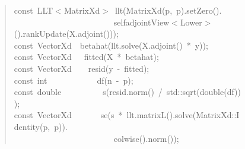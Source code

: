 \documentclass[shortnames,article]{jss}
\newcommand{\hlstd}[1]{\textcolor[rgb]{0,0,0}{#1}}
\newcommand{\hlopt}[1]{\textcolor[rgb]{0,0,0}{#1}}
\newcommand{\hlkwb}[1]{\textcolor[rgb]{0.13,0.54,0.13}{#1}}
\newcommand{\hlkwd}[1]{\textcolor[rgb]{0,0,0}{#1}}
\begin{document}
\begin{figure}[tbh]
\begin{quote}
    \hlstd{}\hlkwb{const\ }\hlstd{LLT}\hlopt{$<$}\hlstd{MatrixXd}\hlopt{$>$\ }\hlstd{}\hlkwd{llt}\hlstd{}\hlopt{(}\hlstd{}\hlkwd{MatrixXd}\hlstd{}\hlopt{(}\hlstd{p}\hlopt{,\ }\hlstd{p}\hlopt{).}\hlstd{}\hlkwd{setZero}\hlstd{}\hlopt{().}\hspace*{\fill}\\
    \hlstd{}\hlstd{\ \ \ \ \ \ \ \ \ \ \ \ \ \ \ \ \ \ \ \ \ \ \ \ }\hlstd{selfadjointView}\hlopt{$<$}\hlstd{Lower}\hlopt{$>$().}\hlstd{}\hlkwd{rankUpdate}\hlstd{}\hlopt{(}\hlstd{X}\hlopt{.}\hlstd{}\hlkwd{adjoint}\hlstd{}\hlopt{()));}\hspace*{\fill}\\
    \hlstd{}\hlkwb{const\ }\hlstd{VectorXd}\hlstd{\ \ }\hlstd{}\hlkwd{betahat}\hlstd{}\hlopt{(}\hlstd{llt}\hlopt{.}\hlstd{}\hlkwd{solve}\hlstd{}\hlopt{(}\hlstd{X}\hlopt{.}\hlstd{}\hlkwd{adjoint}\hlstd{}\hlopt{()\ {*}\ }\hlstd{y}\hlopt{));}\hspace*{\fill}\\
    \hlstd{}\hlkwb{const\ }\hlstd{VectorXd}\hlstd{\ \ \ }\hlstd{}\hlkwd{fitted}\hlstd{}\hlopt{(}\hlstd{X\ }\hlopt{{*}\ }\hlstd{betahat}\hlopt{);}\hspace*{\fill}\\
    \hlstd{}\hlkwb{const\ }\hlstd{VectorXd}\hlstd{\ \ \ \ }\hlstd{}\hlkwd{resid}\hlstd{}\hlopt{(}\hlstd{y\ }\hlopt{{-}\ }\hlstd{fitted}\hlopt{);}\hspace*{\fill}\\
    \hlstd{}\hlkwb{const\ int}\hlstd{\ \ \ \ \ \ \ \ \ \ \ \ }\hlkwb{}\hlstd{}\hlkwd{df}\hlstd{}\hlopt{(}\hlstd{n\ }\hlopt{{-}\ }\hlstd{p}\hlopt{);}\hspace*{\fill}\\
    \hlstd{}\hlkwb{const\ double}\hlstd{\ \ \ \ \ \ \ \ \ \ }\hlkwb{}\hlstd{}\hlkwd{s}\hlstd{}\hlopt{(}\hlstd{resid}\hlopt{.}\hlstd{}\hlkwd{norm}\hlstd{}\hlopt{()\ /\ }\hlstd{std}\hlopt{::}\hlstd{}\hlkwd{sqrt}\hlstd{}\hlopt{(}\hlstd{}\hlkwb{double}\hlstd{}\hlopt{(}\hlstd{df}\hlopt{)));}\hspace*{\fill}\\
    \hlstd{}\hlkwb{const\ }\hlstd{VectorXd}\hlstd{\ \ \ \ \ \ \ }\hlstd{}\hlkwd{se}\hlstd{}\hlopt{(}\hlstd{s\ }\hlopt{{*}\ }\hlstd{llt}\hlopt{.}\hlstd{}\hlkwd{matrixL}\hlstd{}\hlopt{().}\hlstd{}\hlkwd{solve}\hlstd{}\hlopt{(}\hlstd{MatrixXd}\hlopt{::}\hlstd{}\hlkwd{Identity}\hlstd{}\hlopt{(}\hlstd{p}\hlopt{,\ }\hlstd{p}\hlopt{)).}\hspace*{\fill}\\
    \hlstd{}\hlstd{\ \ \ \ \ \ \ \ \ \ \ \ \ \ \ \ \ \ \ \ \ \ \ \ }\hlstd{}\hlkwd{colwise}\hlstd{}\hlopt{().}\hlstd{}\hlkwd{norm}\hlstd{}\hlopt{());}\hspace*{\fill}\\

\end{quote}
\end{figure}
\end{document}

